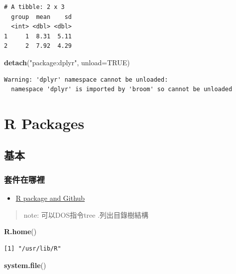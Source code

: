\documentclass[]{book}
\newenvironment{Shaded}{\begin{snugshade}}{\end{snugshade}}
\newcommand{\DataTypeTok}[1]{\textcolor[rgb]{0.13,0.29,0.53}{#1}}
\newcommand{\KeywordTok}[1]{\textcolor[rgb]{0.13,0.29,0.53}{\textbf{#1}}}
\newcommand{\NormalTok}[1]{#1}
\newcommand{\OtherTok}[1]{\textcolor[rgb]{0.56,0.35,0.01}{#1}}
\newcommand{\StringTok}[1]{\textcolor[rgb]{0.31,0.60,0.02}{#1}}
\providecommand{\tightlist}{%
  \setlength{\itemsep}{0pt}\setlength{\parskip}{0pt}}
\theoremstyle{definition}
\theoremstyle{definition}
\theoremstyle{definition}
\theoremstyle{remark}
\begin{document}
\begin{verbatim}
# A tibble: 2 x 3
  group  mean    sd
  <int> <dbl> <dbl>
1     1  8.31  5.11
2     2  7.92  4.29
\end{verbatim}

\begin{Shaded}
\begin{Highlighting}[]
\KeywordTok{detach}\NormalTok{(}\StringTok{"package:dplyr"}\NormalTok{, }\DataTypeTok{unload=}\OtherTok{TRUE}\NormalTok{)}
\end{Highlighting}
\end{Shaded}

\begin{verbatim}
Warning: 'dplyr' namespace cannot be unloaded:
  namespace 'dplyr' is imported by 'broom' so cannot be unloaded
\end{verbatim}

\hypertarget{r-packages}{%
\chapter{R Packages}\label{r-packages}}

\section{基本}

\subsection{套件在哪裡}

\begin{itemize}
\tightlist
\item
  \href{http://r-pkgs.had.co.nz/git.html}{R package and Github}
\end{itemize}

\begin{quote}
note: 可以DOS指令tree .列出目錄樹結構
\end{quote}

\begin{Shaded}
\begin{Highlighting}[]
\KeywordTok{R.home}\NormalTok{()}
\end{Highlighting}
\end{Shaded}

\begin{verbatim}
[1] "/usr/lib/R"
\end{verbatim}

\begin{Shaded}
\begin{Highlighting}[]
\KeywordTok{system.file}\NormalTok{()}
\end{Highlighting}
\end{Shaded}
\end{document}
